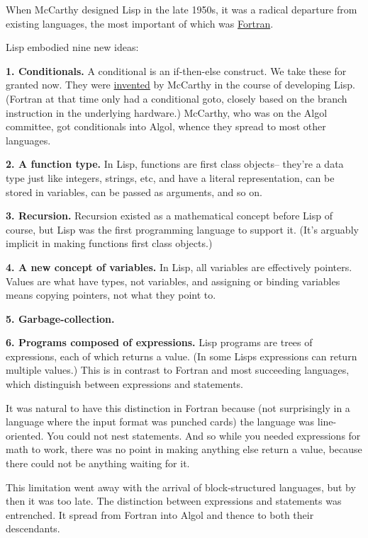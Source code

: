 \documentclass[12pt]{book}
\begin{document}
When McCarthy designed Lisp in the late 1950s, it was a radical
departure from existing languages, the most important of which was
\href{history.html}{Fortran}.

Lisp embodied nine new ideas:

\textbf{1. Conditionals.} A conditional is an if-then-else construct. We
take these for granted now. They were
\href{http://www-formal.stanford.edu/jmc/history/lisp/node2.html}{invented}
by McCarthy in the course of developing Lisp. (Fortran at that time only
had a conditional goto, closely based on the branch instruction in the
underlying hardware.) McCarthy, who was on the Algol committee, got
conditionals into Algol, whence they spread to most other languages.

\textbf{2. A function type.} In Lisp, functions are first class
objects-- they're a data type just like integers, strings, etc, and have
a literal representation, can be stored in variables, can be passed as
arguments, and so on.

\textbf{3. Recursion.} Recursion existed as a mathematical concept
before Lisp of course, but Lisp was the first programming language to
support it. (It's arguably implicit in making functions first class
objects.)

\textbf{4. A new concept of variables.} In Lisp, all variables are
effectively pointers. Values are what have types, not variables, and
assigning or binding variables means copying pointers, not what they
point to.

\textbf{5. Garbage-collection.}

\textbf{6. Programs composed of expressions.} Lisp programs are trees of
expressions, each of which returns a value. (In some Lisps expressions
can return multiple values.) This is in contrast to Fortran and most
succeeding languages, which distinguish between expressions and
statements.

It was natural to have this distinction in Fortran because (not
surprisingly in a language where the input format was punched cards) the
language was line-oriented. You could not nest statements. And so while
you needed expressions for math to work, there was no point in making
anything else return a value, because there could not be anything
waiting for it.

This limitation went away with the arrival of block-structured
languages, but by then it was too late. The distinction between
expressions and statements was entrenched. It spread from Fortran into
Algol and thence to both their descendants.
\end{document}
